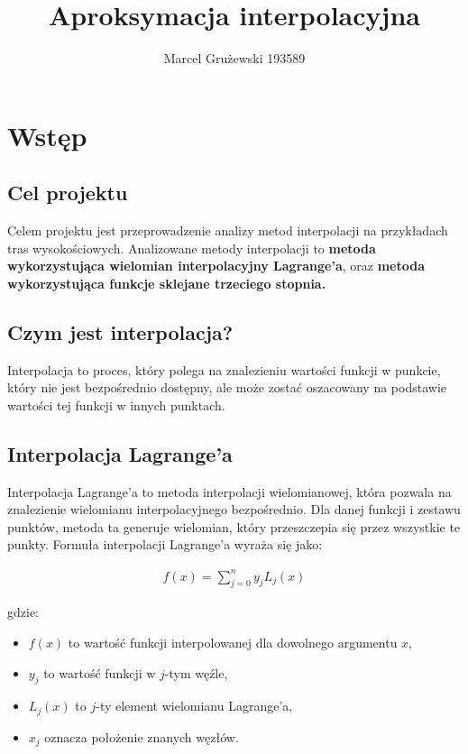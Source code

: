 \documentclass{article}
\title{Aproksymacja interpolacyjna}
\author{Marcel Grużewski 193589}
\begin{document}
\maketitle

\singlespacing
\section{Wstęp}

\subsection{Cel projektu}
Celem projektu jest przeprowadzenie analizy metod interpolacji na przykładach tras wysokościowych.
Analizowane metody interpolacji to \textbf{metoda wykorzystująca wielomian interpolacyjny Lagrange’a},
oraz \textbf{metoda wykorzystująca funkcje sklejane trzeciego stopnia.}


\subsection{Czym jest interpolacja?}

Interpolacja to proces, który polega na znalezieniu wartości funkcji w punkcie, który nie jest bezpośrednio dostępny, ale może zostać oszacowany na podstawie wartości tej funkcji w innych punktach.

\subsection{Interpolacja Lagrange'a}

Interpolacja Lagrange'a to metoda interpolacji wielomianowej, która pozwala na znalezienie wielomianu interpolacyjnego bezpośrednio. Dla danej funkcji i zestawu punktów, metoda ta generuje wielomian, który przeszczepia się przez wszystkie te punkty. Formuła interpolacji Lagrange'a wyraża się jako:

\begin{align}
f(x) = \sum_{j=0}^{n} y_j L_j(x)
\end{align}

gdzie:

\begin{itemize}
    \item \( f(x) \) to wartość funkcji interpolowanej dla dowolnego argumentu \( x \),
    \item \( y_j \) to wartość funkcji w \( j \)-tym węźle,
    \item \( L_j(x) \) to \( j \)-ty element wielomianu Lagrange'a,
    \item \( x_j \) oznacza położenie znanych węzłów.
\end{itemize}
\end{document}
